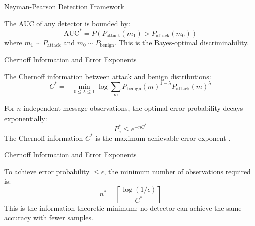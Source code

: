 \documentclass[
  ignorenonframetext,
]{beamer}
\begin{document}
\begin{frame}[allowframebreaks]{Neyman-Pearson Detection Framework}
\begin{corollary}
\label{cor:optimal-auc}
The AUC of any detector is bounded by:
\begin{equation}
\label{eq:optimal-auc}
\text{AUC}^* = P(P_{\text{attack}}(m_1) > P_{\text{attack}}(m_0))
\end{equation}
where $m_1 \sim P_{\text{attack}}$ and $m_0 \sim P_{\text{benign}}$. This is the Bayes-optimal discriminability.
\end{corollary}
\end{frame}

\begin{frame}[allowframebreaks]{Chernoff Information and Error
Exponents}
\protect{}\label{chernoff-information-and-error-exponents}
\begin{definition}
\label{def:chernoff}
The Chernoff information between attack and benign distributions:
\begin{equation}
\label{eq:chernoff}
C^* = -\min_{0 \leq \lambda \leq 1} \log \sum_m P_{\text{benign}}(m)^{1-\lambda} P_{\text{attack}}(m)^\lambda
\end{equation}
\end{definition}

\begin{theorem}
\label{thm:error-exponent}
For $n$ independent message observations, the optimal error probability decays exponentially:
\begin{equation}
\label{eq:error-exponent}
P_e^* \leq e^{-n C^*}
\end{equation}
The Chernoff information $C^*$ is the maximum achievable error exponent \cite{chernoff1952measure}.
\end{theorem}

\end{frame}

\begin{frame}[allowframebreaks]{Chernoff Information and Error
Exponents}
\begin{corollary}
\label{cor:sample-complexity}
To achieve error probability $\leq \epsilon$, the minimum number of observations required is:
\begin{equation}
\label{eq:sample-complexity}
n^* = \left\lceil \frac{\log(1/\epsilon)}{C^*} \right\rceil
\end{equation}
This is the information-theoretic minimum; no detector can achieve the same accuracy with fewer samples.
\end{corollary}
\end{frame}
\end{document}
